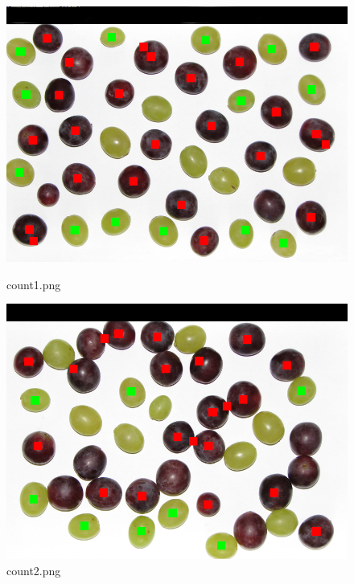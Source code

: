 \documentclass{classrep}
\begin{document}
\begin{figure}
  \begin{minipage}{0.3\linewidth}
    \centering
    \includegraphics[width=\textwidth]{gfx/count1_overlayed.png}
    \caption{count1.png}
    \label{fig:c1}
  \end{minipage}
  \hspace{0.5cm}
  \begin{minipage}{0.3\linewidth}
    \centering
    \includegraphics[width=\textwidth]{gfx/count2_overlayed.png}
    \caption{count2.png}
    \label{fig:c2}
  \end{minipage}
  \begin{minipage}{0.3\linewidth}
    \centering

\end{minipage}
\end{figure}
\end{document}
